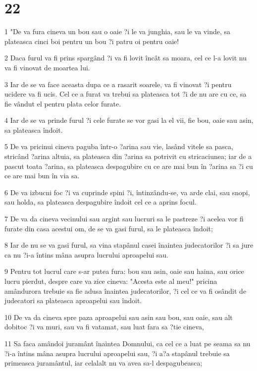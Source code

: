 \chapter{22}

\par 1 "De va fura cineva un bou sau o oaie ?i le va junghia, sau le va vinde, sa plateasca cinci boi pentru un bou ?i patru oi pentru oaie!
\par 2 Daca furul va fi prins spargând ?i va fi lovit încât sa moara, cel ce l-a lovit nu va fi vinovat de moartea lui.
\par 3 Iar de se va face aceasta dupa ce a rasarit soarele, va fi vinovat ?i pentru ucidere va fi ucis. Cel ce a furat va trebui sa plateasca tot ?i de nu are cu ce, sa fie vândut el pentru plata celor furate.
\par 4 Iar de se va prinde furul ?i cele furate se vor gasi la el vii, fie bou, oaie sau asin, sa plateasca îndoit.
\par 5 De va pricinui cineva paguba într-o ?arina sau vie, lasând vitele sa pasca, stricând ?arina altuia, sa plateasca din ?arina sa potrivit cu stricaciunea; iar de a pascut toata ?arina, sa plateasca despagubire cu ce are mai bun în ?arina sa ?i cu ce are mai bun în via sa.
\par 6 De va izbucni foc ?i va cuprinde spini ?i, întinzându-se, va arde clai, sau snopi, sau holda, sa plateasca despagubire îndoit cel ce a aprins focul.
\par 7 De va da cineva vecinului sau argint sau lucruri sa le pastreze ?i acelea vor fi furate din casa acestui om, de se va gasi furul, sa le plateasca îndoit;
\par 8 Iar de nu se va gasi furul, sa vina stapânul casei înaintea judecatorilor ?i sa jure ca nu ?i-a întins mâna asupra lucrului aproapelui sau.
\par 9 Pentru tot lucrul care s-ar putea fura: bou sau asin, oaie sau haina, sau orice lucru pierdut, despre care va zice cineva: "Acesta este al meu!" pricina amândurora trebuie sa fie adusa înaintea judecatorilor, ?i cel ce va fi osândit de judecatori sa plateasca aproapelui sau îndoit.
\par 10 De va da cineva spre paza aproapelui sau asin sau bou, sau oaie, sau alt dobitoc ?i va muri, sau va fi vatamat, sau luat fara sa ?tie cineva,
\par 11 Sa faca amândoi juramânt înaintea Domnului, ca cel ce a luat pe seama sa nu ?i-a întins mâna asupra lucrului aproapelui sau, ?i a?a stapânul trebuie sa primeasca juramântul, iar celalalt nu va avea sa-l despagubeasca;
